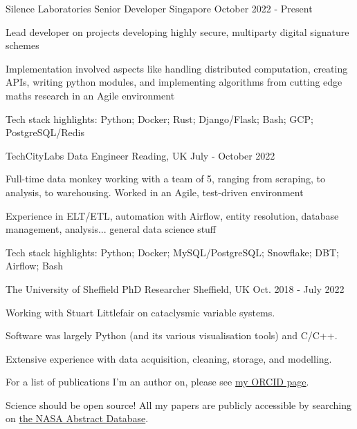 \begin{cventries}

  \cventry
    {Silence Laboratories}
    {Senior Developer}
    {Singapore}
    {October 2022 - Present}
    {
      \begin{cvitems}
          \item {Lead developer on projects developing highly secure, multiparty digital signature schemes}
          \item {Implementation involved aspects like handling distributed computation, creating APIs, writing python modules, and implementing algorithms from cutting edge maths research in an Agile environment}
          \item {Tech stack highlights: Python; Docker; Rust; Django/Flask; Bash; GCP; PostgreSQL/Redis}
      \end{cvitems}
    }

  \cventry
    {TechCityLabs}
    {Data Engineer}
    {Reading, UK}
    {July - October 2022}
    {
      \begin{cvitems}
        \item {Full-time data monkey working with a team of 5, ranging from scraping, to analysis, to warehousing. Worked in an Agile, test-driven environment}
        \item {Experience in ELT/ETL, automation with Airflow, entity resolution, database management, analysis... general data science stuff}
        \item {Tech stack highlights: Python; Docker; MySQL/PostgreSQL; Snowflake; DBT; Airflow; Bash}
      \end{cvitems}
    }

  \cventry
    {The University of Sheffield}
    {PhD Researcher}
    {Sheffield, UK}
    {Oct. 2018 - July 2022}
    {
      \begin{cvitems}
        \item {Working with Stuart Littlefair on cataclysmic variable systems.}
        \item {Software was largely Python (and its various visualisation tools) and C/C++.}
        \item {Extensive experience with data acquisition, cleaning, storage, and modelling.}
        \item {For a list of publications I'm an author on, please see \href{https://orcid.org/0000-0002-9967-590X}{my ORCID page}.}
        \item {Science should be open source! All my papers are publicly accessible by searching on \href{https://ui.adsabs.harvard.edu/search/p_=0&q=orcid\%3A0000-0002-9967-590X&sort=date\%20desc\%2C\%20bibcode\%20desc}{the NASA Abstract Database}.}
      \end{cvitems}
    }
    

\end{cventries}
